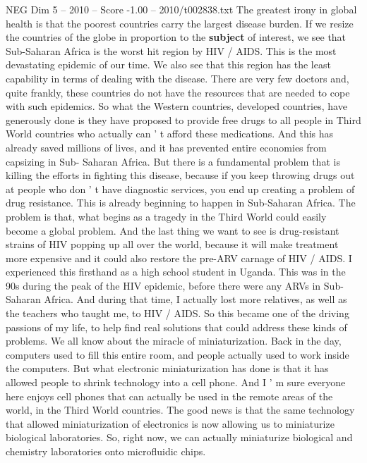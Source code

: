 \begin{textsample}{NEG Dim 5 – 2010 – Score -1.00 – 2010/t002838.txt}  \label{ex:f5_neg_052}
The greatest irony in global health is that the poorest countries carry the largest disease burden.
If we resize the countries of the globe in proportion to the \textbf{subject} of interest, we see that Sub-Saharan Africa is the worst hit region by HIV / AIDS.
This is the most devastating epidemic of our time.
We also see that this region has the least capability in terms of dealing with the disease.
There are very few doctors and, quite frankly, these countries do not have the resources that are needed to cope with such epidemics.
So what the Western countries, developed countries, have generously done is they have proposed to provide free drugs to all people in Third World countries who actually can ' t afford these medications.
And this has already saved millions of lives, and it has prevented entire economies from capsizing in Sub- Saharan Africa.
But there is a fundamental problem that is killing the efforts in fighting this disease, because if you keep throwing drugs out at people who don ' t have diagnostic services, you end up creating a problem of drug resistance.
This is already beginning to happen in Sub-Saharan Africa.
The problem is that, what begins as a tragedy in the Third World could easily become a global problem.
And the last thing we want to see is drug-resistant strains of HIV popping up all over the world, because it will make treatment more expensive and it could also restore the pre-ARV carnage of HIV / AIDS.
I experienced this firsthand as a high school student in Uganda.
This was in the 90s during the peak of the HIV epidemic, before there were any ARVs in Sub- Saharan Africa.
And during that time, I actually lost more relatives, as well as the teachers who taught me, to HIV / AIDS.
So this became one of the driving passions of my life, to help find real solutions that could address these kinds of problems.
We all know about the miracle of miniaturization.
Back in the day, computers used to fill this entire room, and people actually used to work inside the computers.
But what electronic miniaturization has done is that it has allowed people to shrink technology into a cell phone.
And I ' m sure everyone here enjoys cell phones that can actually be used in the remote areas of the world, in the Third World countries.
The good news is that the same technology that allowed miniaturization of electronics is now allowing us to miniaturize biological laboratories.
So, right now, we can actually miniaturize biological and chemistry laboratories onto microfluidic chips.

\end{textsample}
